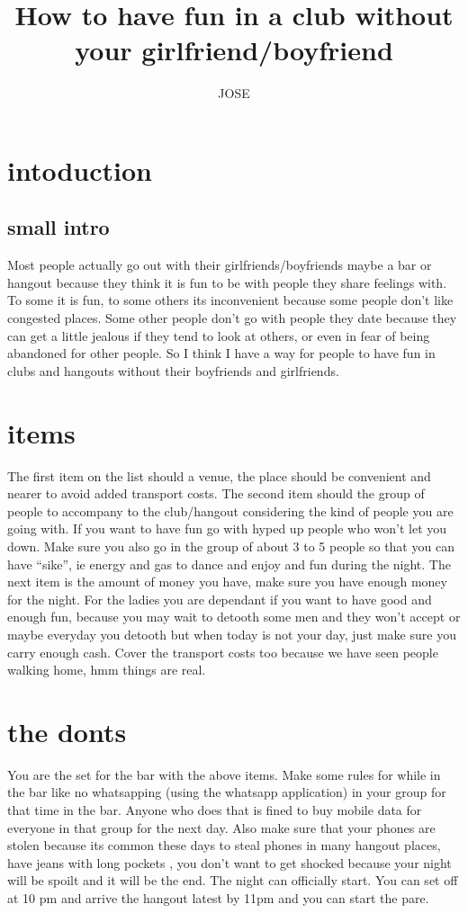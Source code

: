 \documentclass{article}
\begin{document}
\title{How to have fun in a club without your girlfriend/boyfriend}
\author{JOSE}
\maketitle
\section{intoduction}
\subsection{small intro}
Most people actually go out with their girlfriends/boyfriends maybe a bar or hangout because they think it is fun to be with people they share feelings with. To some it is fun, to some others its inconvenient because some people don’t like congested places. Some other people don’t go with people they date because they can get a little jealous if they tend to look at others, or even in fear of being abandoned for other people. So I think I have a way for people to have fun in clubs and hangouts without their boyfriends and girlfriends.
\section{items}
The first item on the list should a venue, the place should be convenient and nearer to avoid added transport costs. The second item should the group of people to accompany to the club/hangout considering the kind of people you are going with. If you want to have fun go with hyped up people who won’t let you down. Make sure you also go in the group of about 3 to 5 people so that you can have “sike”, ie energy and gas to dance and enjoy and fun during the night. The next item is the amount of money you have, make sure you have enough money for the night. For the ladies you are dependant if you want to have good and enough fun, because you may wait to detooth some men and they won’t accept or maybe everyday you detooth but when today is not your day, just make sure you carry enough cash. Cover the transport costs too because we have seen people walking home, hmm things are real.
\section{the donts}
You are the set for the bar with the above items. Make some rules for while in the bar like no whatsapping (using the whatsapp application) in your group for that time in the bar. Anyone who does that is fined to buy mobile data for everyone in that group for the next day. Also make sure that your phones are stolen because its common these days to steal phones in many hangout places, have jeans with long pockets , you don’t want  to get shocked because your night will be spoilt and it will be the end. The night can officially start. You can set off at 10 pm and arrive the hangout latest by 11pm and you can start the pare.
\end{document}

